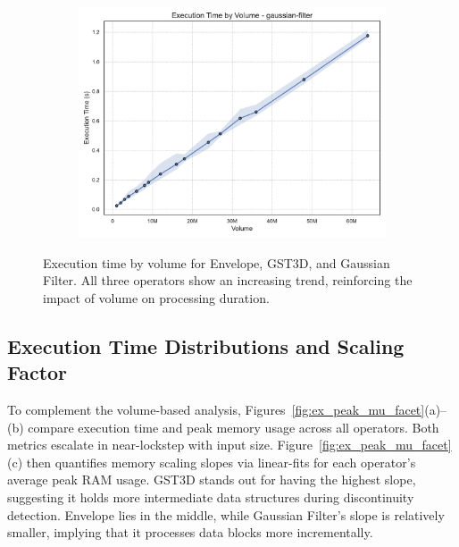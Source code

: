 \begin{figure}[htbp]
\begin{subfigure}[t]{0.49\textwidth}
        \includegraphics[width=\textwidth]{assets/images/05/execution_time_by_volume_gaussian-filter}
    \end{subfigure}
    \caption{Execution time by volume for Envelope, \ac{GST3D}, and Gaussian Filter. All three operators show an increasing trend, reinforcing the impact of volume on processing duration.}
    \label{fig:execution_time_by_volume_facet}
\end{figure}

\subsection{Execution Time Distributions and Scaling Factor}
\label{subsec:execution-time-distributions-and-scaling}

To complement the volume-based analysis, Figures~\ref{fig:ex_peak_mu_facet}(a)--(b) compare execution time and peak memory usage across all operators.
Both metrics escalate in near-lockstep with input size.
Figure~\ref{fig:ex_peak_mu_facet}(c) then quantifies memory scaling slopes via linear-fits for each operator’s average peak \ac{RAM} usage. \ac{GST3D} stands out for having the highest slope, suggesting it holds more intermediate data structures during discontinuity detection.
Envelope lies in the middle, while Gaussian Filter’s slope is relatively smaller, implying that it processes data blocks more incrementally.

